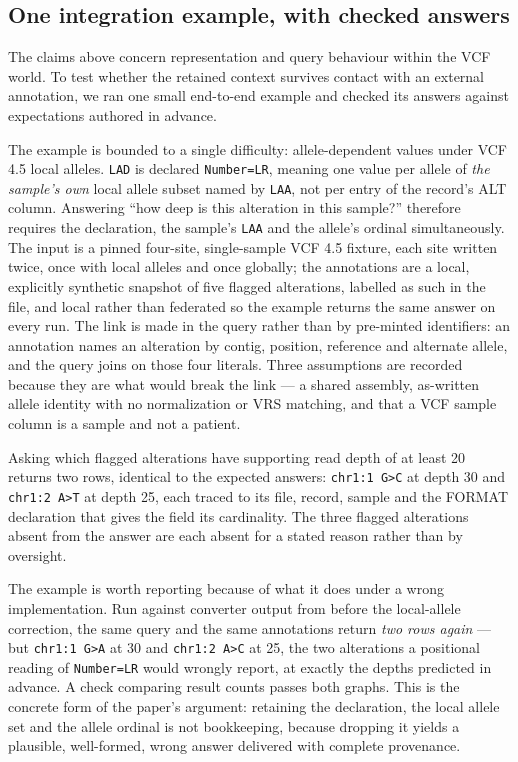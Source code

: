\documentclass{ceurart}
\begin{document}
\subsection{One integration example, with checked answers}
\label{sec:integration}

The claims above concern representation and query behaviour within the VCF world. 
To test whether the retained context survives contact with an external annotation, we ran one small end-to-end example and checked its answers against expectations authored in advance.

The example is bounded to a single difficulty: allele-dependent values under VCF 4.5 local alleles. 
\texttt{LAD} is declared \texttt{Number=LR}, meaning one value per allele of \emph{the sample's own} local allele subset named by \texttt{LAA}, not per entry of the record's ALT column. 
Answering ``how deep is this alteration in this sample?'' therefore requires the declaration, the sample's \texttt{LAA} and the allele's ordinal simultaneously. 
The input is a pinned four-site, single-sample VCF 4.5 fixture, each site written twice, once with local alleles and once globally; the annotations are a local, explicitly synthetic snapshot of five flagged alterations, labelled as such in the file, and local rather than federated so the example returns the same answer on every run. 
The link is made in the query rather than by pre-minted identifiers: an annotation names an alteration by contig, position, reference and alternate allele, and the query joins on those four literals. 
Three assumptions are recorded because they are what would break the link --- a shared assembly, as-written allele identity with no normalization or VRS matching, and that a VCF sample column is a sample and not a patient.

Asking which flagged alterations have supporting read depth of at least 20 returns two rows, identical to the expected answers: \texttt{chr1:1~G>C} at depth 30 and \texttt{chr1:2~A>T} at depth 25, each traced to its file, record, sample and the FORMAT declaration that gives the field its cardinality. 
The three flagged alterations absent from the answer are each absent for a stated reason rather than by oversight.

The example is worth reporting because of what it does under a wrong implementation. 
Run against converter output from before the local-allele correction, the same query and the same annotations return \emph{two rows again} --- but \texttt{chr1:1~G>A} at 30 and \texttt{chr1:2~A>C} at 25, the two alterations a positional reading of \texttt{Number=LR} would wrongly report, at exactly the depths predicted in advance. 
A check comparing result counts passes both graphs. 
This is the concrete form of the paper's argument: retaining the declaration, the local allele set and the allele ordinal is not bookkeeping, because dropping it yields a plausible, well-formed, wrong answer delivered with complete provenance.
\end{document}
